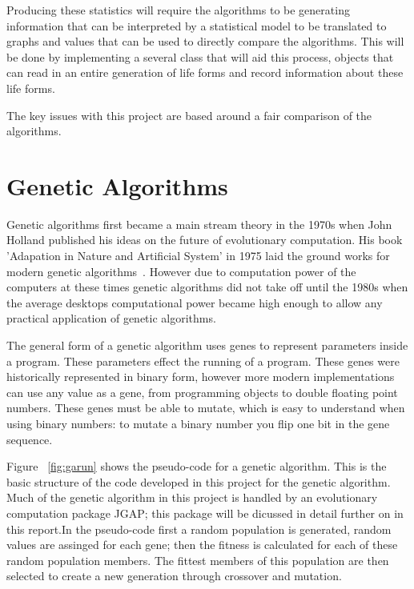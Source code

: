 \documentclass[12pt]{article}
\begin{document}
Producing these statistics will require the algorithms to be generating information that can be interpreted by a statistical model to be translated to graphs and values that can be
used to directly compare the algorithms. This will be done by implementing a several class that will aid this process, objects that can read in an entire generation of life forms
and record information about these life forms. 


The key issues with this project are based around a fair comparison of the algorithms. 

\section{Genetic Algorithms}

Genetic algorithms first became a main stream theory in the 1970s when John Holland published his ideas on the future of evolutionary 
computation. His book 'Adapation in Nature and Artificial System' in 1975 laid the ground works for modern genetic algorithms~\cite{holland1992adaptation}. However due to computation
power of the computers at these times genetic algorithms did not take off until the 1980s when the average desktops computational power became
high enough to allow any practical application of genetic algorithms.

The general form of a genetic algorithm uses genes to represent parameters inside a program.
These parameters effect the running of a program.
These genes were historically represented in binary form, however more modern implementations can use any value as a gene, from programming objects to double floating point numbers.
These genes must be able to mutate, which is easy to understand when using binary numbers: to mutate a binary number you flip one bit in the gene sequence. 

Figure ~\ref{fig:garun} shows the pseudo-code for a genetic algorithm. This is the basic structure of the code developed in this project for the genetic algorithm.
Much of the genetic algorithm in this project is handled by an evolutionary computation package JGAP; this package will be dicussed in detail further on in this
report.In the pseudo-code first a random population is generated, random values are assinged for each gene; then the fitness is calculated for each of these
random population members. The fittest members of this population are then selected to create a new generation through crossover and mutation. 
\end{document}
